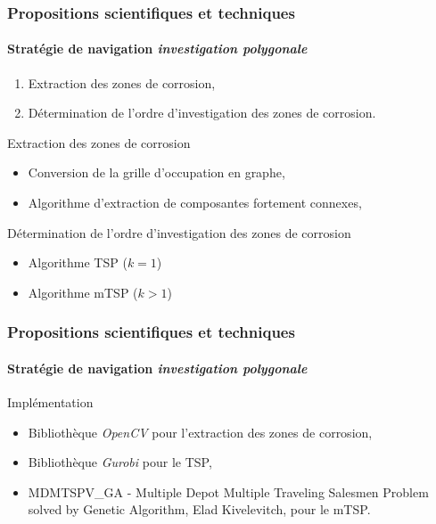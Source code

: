 \documentclass{beamer}
\begin{document}
			\begin{frame}
				\frametitle{Propositions scientifiques et techniques}
				\framesubtitle{Stratégie de navigation \textit{investigation polygonale}}
				\begin{enumerate}
					\item Extraction des zones de corrosion,
					\item Détermination de l'ordre d'investigation des zones de corrosion.
				\end{enumerate}
				\begin{block}{Extraction des zones de corrosion}
					\begin{itemize}
						\item Conversion de la grille d'occupation en graphe,
						\item Algorithme d'extraction de composantes fortement connexes,
					\end{itemize}
				\end{block}
				\begin{block}{Détermination de l'ordre d'investigation des zones de corrosion}
					\begin{itemize}
						\item Algorithme TSP ($k = 1$)
						\item Algorithme mTSP ($k > 1$)
					\end{itemize}
				\end{block}
			\end{frame}
			\begin{frame}
				\frametitle{Propositions scientifiques et techniques}
				\framesubtitle{Stratégie de navigation \textit{investigation polygonale}}
				Implémentation
				\begin{itemize}
					\item Bibliothèque \textit{OpenCV} pour l'extraction des zones de corrosion,
					\item Bibliothèque \textit{Gurobi} pour le TSP,
					\item MDMTSPV\_GA - Multiple Depot Multiple Traveling Salesmen Problem solved by Genetic Algorithm, Elad Kivelevitch, pour le mTSP.
				\end{itemize}
			\end{frame}
\end{document}
